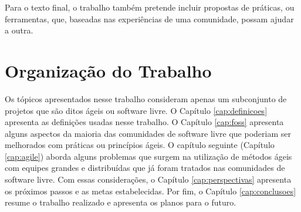 Para o texto final, o trabalho também pretende incluir propostas de
práticas, ou ferramentas, que, baseadas nas experiências de uma
comunidade, possam ajudar a outra.

\section{Organização do Trabalho}
\label{sec:organizacao_trabalho}

Os tópicos apresentados nesse trabalho consideram apenas um
subconjunto de projetos que são ditos ágeis ou software livre. O
Capítulo \ref{cap:definicoes} apresenta as definições usadas nesse
trabalho. O Capítulo \ref{cap:foss} apresenta alguns aspectos da
maioria das comunidades de software livre que poderiam ser melhorados
com práticas ou princípios ágeis. O capítulo seguinte (Capítulo
\ref{cap:agile}) aborda alguns problemas que surgem na utilização de
métodos ágeis com equipes grandes e distribuídas que já foram tratados
nas comunidades de software livre. Com essas considerações, o Capítulo
\ref{cap:perspectivas} apresenta os próximos passos e as metas
estabelecidas. Por fim, o Capítulo \ref{cap:conclusoes} resume o
trabalho realizado e apresenta os planos para o futuro.
